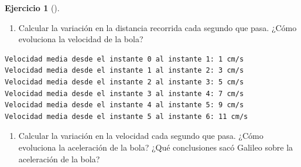 \documentclass[
  a4paper,
]{scrreport}
\newenvironment{Shaded}{\begin{snugshade}}{\end{snugshade}}
\newcommand{\ControlFlowTok}[1]{\textcolor[rgb]{0.00,0.23,0.31}{#1}}
\newcommand{\FloatTok}[1]{\textcolor[rgb]{0.68,0.00,0.00}{#1}}
\newcommand{\FunctionTok}[1]{\textcolor[rgb]{0.28,0.35,0.67}{#1}}
\newcommand{\KeywordTok}[1]{\textcolor[rgb]{0.00,0.23,0.31}{#1}}
\newcommand{\NormalTok}[1]{\textcolor[rgb]{0.00,0.23,0.31}{#1}}
\newcommand{\OperatorTok}[1]{\textcolor[rgb]{0.37,0.37,0.37}{#1}}
\newcommand{\SpecialCharTok}[1]{\textcolor[rgb]{0.37,0.37,0.37}{#1}}
\newcommand{\StringTok}[1]{\textcolor[rgb]{0.13,0.47,0.30}{#1}}
\providecommand{\tightlist}{%
  \setlength{\itemsep}{0pt}\setlength{\parskip}{0pt}}\usepackage{longtable,booktabs,array}
\theoremstyle{definition}
\newtheorem{exercise}{Ejercicio}[chapter]
\theoremstyle{remark}
\begin{document}
\begin{exercise}[]
\begin{tcolorbox}
\end{tcolorbox}

\begin{enumerate}
\def\labelenumi{\alph{enumi}.}
\setcounter{enumi}{3}
\tightlist
\item
  Calcular la variación en la distancia recorrida cada segundo que pasa.
  ¿Cómo evoluciona la velocidad de la bola?
\end{enumerate}

\begin{tcolorbox}[enhanced jigsaw, toptitle=1mm, colframe=quarto-callout-tip-color-frame, opacitybacktitle=0.6, colback=white, titlerule=0mm, toprule=.15mm, arc=.35mm, coltitle=black, colbacktitle=quarto-callout-tip-color!10!white, bottomtitle=1mm, bottomrule=.15mm, title=\textcolor{quarto-callout-tip-color}{\faLightbulb}\hspace{0.5em}{Solución}, rightrule=.15mm, opacityback=0, leftrule=.75mm, left=2mm, breakable]

\begin{Shaded}
\end{Shaded}

\begin{verbatim}
Velocidad media desde el instante 0 al instante 1: 1 cm/s
Velocidad media desde el instante 1 al instante 2: 3 cm/s
Velocidad media desde el instante 2 al instante 3: 5 cm/s
Velocidad media desde el instante 3 al instante 4: 7 cm/s
Velocidad media desde el instante 4 al instante 5: 9 cm/s
Velocidad media desde el instante 5 al instante 6: 11 cm/s
\end{verbatim}

\end{tcolorbox}

\begin{enumerate}
\def\labelenumi{\alph{enumi}.}
\setcounter{enumi}{4}
\tightlist
\item
  Calcular la variación en la velocidad cada segundo que pasa. ¿Cómo
  evoluciona la aceleración de la bola? ¿Qué conclusiones sacó Galileo
  sobre la aceleración de la bola?
\end{enumerate}


\end{exercise}
\end{document}
